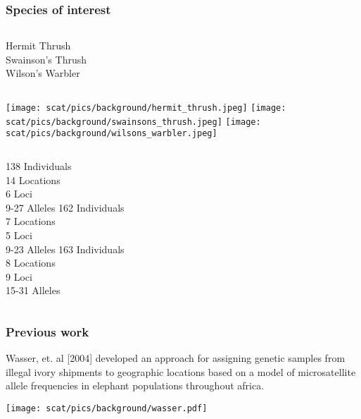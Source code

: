 \begin{frame}[shrink]
\frametitle{Species of interest}

\begin{columns}[c]
 Hermit Thrush\\
 Swainson's Thrush\\
 Wilson's Warbler\\
\end{columns}

\vspace{5mm}

\begin{columns}
\texttt{[image: scat/pics/background/hermit\_thrush.jpeg]}
\texttt{[image: scat/pics/background/swainsons\_thrush.jpeg]}
\texttt{[image: scat/pics/background/wilsons\_warbler.jpeg]}
\end{columns}

\vspace{5mm}

\footnotesize{
\begin{columns}
138 Individuals\\
14 Locations\\
6 Loci\\
9-27 Alleles
162 Individuals\\
7 Locations\\
5 Loci\\
9-23 Alleles
163 Individuals\\
8 Locations\\
9 Loci\\
15-31 Alleles
\end{columns}
}
\end{frame}



\begin{frame}
\frametitle{Previous work}

\footnotesize{
Wasser, et. al [2004] developed an approach for assigning genetic samples from illegal ivory shipments to geographic locations based on a model of microsatellite allele frequencies in elephant populations throughout africa.
}
\begin{center}
\texttt{[image: scat/pics/background/wasser.pdf]}
\end{center}

\end{frame}

